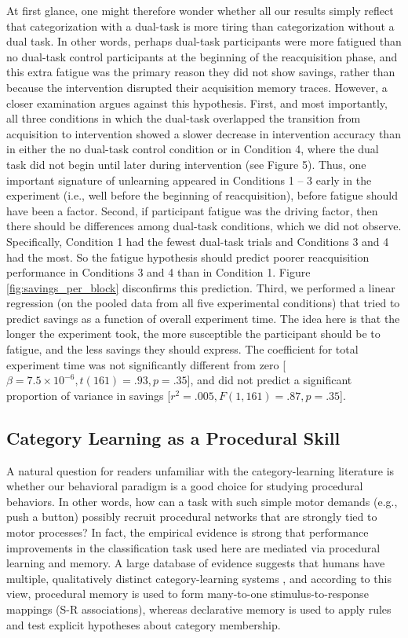 \documentclass[man,apacite,draftfirst]{apa6} \usepackage{amsmath}
\begin{document}
At first glance, one might therefore wonder whether all our results simply
reflect that categorization with a dual-task is more tiring than categorization
without a dual task. In other words, perhaps dual-task participants were more
fatigued than no dual-task control participants at the beginning of the
reacquisition phase, and this extra fatigue was the primary reason they did not
show savings, rather than because the intervention disrupted their acquisition
memory traces. However, a closer examination argues against this hypothesis.
First, and most importantly, all three conditions in which the dual-task
overlapped the transition from acquisition to intervention showed a slower
decrease in intervention accuracy than in either the no dual-task control
condition or in Condition 4, where the dual task did not begin until later
during intervention (see Figure 5). Thus, one important signature of unlearning
appeared in Conditions 1 -- 3 early in the experiment (i.e., well before the
beginning of reacquisition), before fatigue should have been a factor. Second,
if participant fatigue was the driving factor, then there should be differences
among dual-task conditions, which we did not observe. Specifically, Condition 1
had the fewest dual-task trials and Conditions 3 and 4 had the most. So the
fatigue hypothesis should predict poorer reacquisition performance in Conditions
3 and 4 than in Condition 1. Figure \ref{fig:savings_per_block} disconfirms this
prediction. Third, we performed a linear regression (on the pooled data from all
five experimental conditions) that tried to predict savings as a function of
overall experiment time. The idea here is that the longer the experiment took,
the more susceptible the participant should be to fatigue, and the less savings
they should express. The coefficient for total experiment time was not
significantly different from zero [$\beta=7.5 \times 10^{-6}, t(161)=.93,
p=.35$], and did not predict a significant proportion of variance in savings
[$r^2=.005, F(1,161)=.87, p=.35$].

\subsection*{Category Learning as a Procedural Skill} A natural question for
readers unfamiliar with the category-learning literature is whether our
behavioral paradigm is a good choice for studying procedural behaviors. In other
words, how can a task with such simple motor demands (e.g., push a button)
possibly recruit procedural networks that are strongly tied to motor processes?
In fact, the empirical evidence is strong that performance improvements in the
classification task used here are mediated via procedural learning and memory. A
large database of evidence suggests that humans have multiple, qualitatively
distinct category-learning systems \cite{AshbyCOVIS1998, AshbyMaddox2005,
EricksonKruschke1998}, and according to this view, procedural memory is used to
form many-to-one stimulus-to-response mappings (S-R associations), whereas
declarative memory is used to apply rules and test explicit hypotheses about
category membership.
\end{document}
